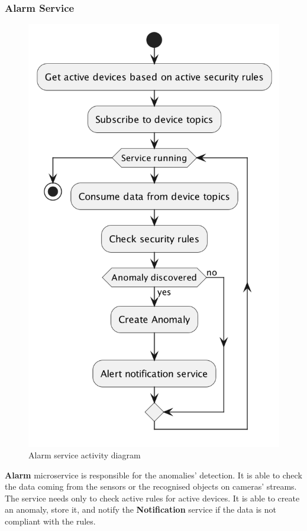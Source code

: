 \documentclass{scrartcl}
\begin{document}
    \subsubsection{Alarm Service}
    \begin{figure}
        \centering
        \includegraphics[scale=0.24]{img/alarm-activity}
        \caption{Alarm service activity diagram}
        \label{fig:alarm-activity}
    \end{figure}

    \textbf{Alarm} microservice is responsible for the anomalies' detection.
    It is able to check the data coming from the sensors or the recognised objects on cameras' streams.
    The service needs only to check active rules for active devices.
    It is able to create an anomaly, store it, and notify the \textbf{Notification} service if the data is not compliant with the rules.
\end{document}
